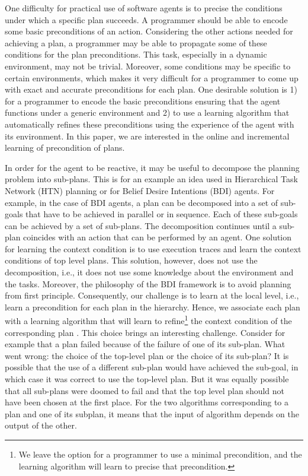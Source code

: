 \documentclass{article}
\begin{document}
One difficulty for practical use of software agents is to precise the
conditions under which a specific plan succeeds. A programmer should
be able to encode some basic preconditions of an action. Considering
the other actions needed for achieving a plan, a programmer may be
able to propagate some of these conditions for the plan preconditions.
This task, especially in a dynamic environment, may not be
trivial. Moreover, some conditions may be specific to certain
environments, which makes it very difficult for a programmer to come
up with exact and accurate preconditions for each plan.  One desirable
solution is 1) for a programmer to encode the basic preconditions
ensuring that the agent functions under a generic environment and 2)
to use a learning algorithm that automatically refines these
preconditions using the experience of the agent with its
environment. In this paper, we are interested in the online and
incremental learning of precondition of plans.

In order for the agent to be reactive, it may be useful to decompose
the planning problem into sub-plans. This is for an example an idea
used in Hierarchical Task Network (HTN) planning or for Belief Desire
Intentions (BDI) agents.  For example, in the case of BDI agents, a
plan can be decomposed into a set of sub-goals that have to be
achieved in parallel or in sequence. Each of these sub-goals can be
achieved by a set of sub-plans. The decomposition continues until a
sub-plan coincides with an action that can be performed by an
agent. One solution for learning the context condition is to use
execution traces and learn the context conditions of top level
plans. This solution, however, does not use the decomposition, i.e.,
it does not use some knowledge about the environment and the
tasks. Moreover, the philosophy of the BDI framework is to avoid
planning from first principle. Consequently, our challenge is to learn
at the local level, i.e., learn a precondition for each plan in the
hierarchy.  Hence, we associate each plan with a learning algorithm
that will learn to refine\footnote{We leave the option for a
  programmer to use a minimal precondition, and the learning algorithm
  will learn to precise that precondition.} the context condition of
the corresponding plan .  This choice brings an interesting
challenge. Consider for example that a plan failed because of the
failure of one of its sub-plan. What went wrong: the choice of the
top-level plan or the choice of its sub-plan?  It is possible that the
use of a different sub-plan would have achieved the sub-goal, in which
case it was correct to use the top-level plan. But it was equally
possible that all sub-plans were doomed to fail and that the top level
plan should not have been chosen at the first place.  For the two
algorithms corresponding to a plan and one of its subplan, it means
that the input of algorithm depends on the output of the other.
\end{document}
